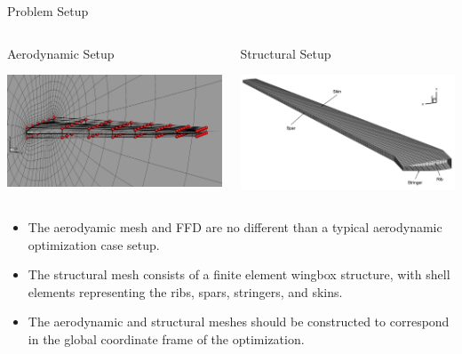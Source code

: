 \documentclass{bredelebeamer}
\begin{document}
\begin{frame}{Problem Setup}
  \begin{columns}
    \begin{column}{0.5\textwidth}
      \begin{center}
        Aerodynamic Setup
      \end{center}
      \includegraphics[width=1.0\linewidth]{images/aerostruct-aeroMeshFFD.png}
    \end{column}
    \begin{column}{0.5\textwidth}
      \begin{center}
        Structural Setup
      \end{center}
      \includegraphics[width=1.0\linewidth]{images/aerostruct-structSetup.png}
    \end{column}
  \end{columns}
  \begin{itemize}
    \item \small The aerodyamic mesh and FFD are no different than a typical aerodynamic optimization case setup.
    \item \small The structural mesh consists of a finite element wingbox structure, with shell elements representing the ribs, spars, stringers, and skins.
    \item \small The aerodynamic and structural meshes should be constructed to correspond in the global coordinate frame of the optimization.
  \end{itemize}
\end{frame}
\end{document}
